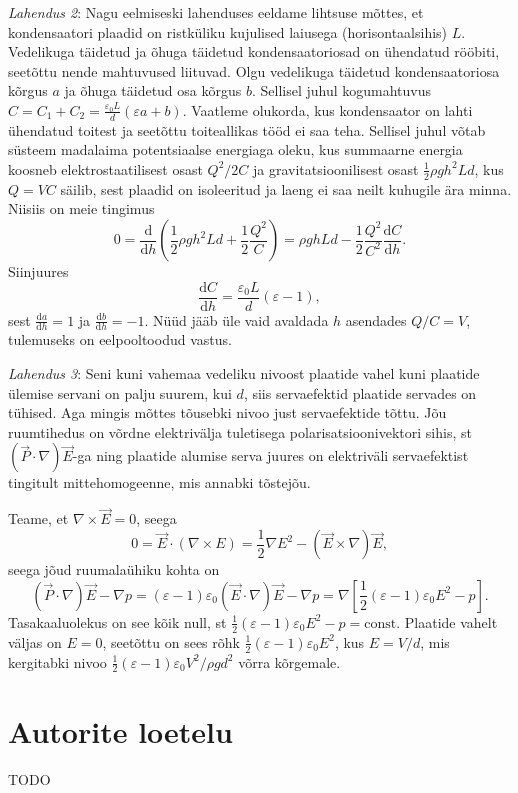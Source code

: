 \documentclass[10pt]{article}
\begin{document}
\textit{Lahendus 2}: Nagu eelmiseski lahenduses eeldame lihtsuse mõttes, et kondensaatori plaadid on ristküliku kujulised laiusega (horisontaalsihis) $L$. Vedelikuga täidetud ja õhuga täidetud kondensaatoriosad on ühendatud rööbiti, seetõttu nende mahtuvused liituvad. Olgu vedelikuga täidetud kondensaatoriosa kõrgus $a$ ja õhuga täidetud osa kõrgus $b$. Sellisel juhul  kogumahtuvus $C=C_1+C_2= \frac{\varepsilon_0 L}{d}(\varepsilon a+b)$. Vaatleme olukorda, kus kondensaator on lahti ühendatud toitest ja seetõttu toiteallikas tööd ei saa teha. Sellisel juhul võtab süsteem madalaima potentsiaalse energiaga oleku, kus summaarne energia koosneb elektrostaatilisest osast $Q^2/2C$ ja gravitatsioonilisest osast $\frac 12\rho g h^2Ld$, kus $Q=VC$ säilib, sest plaadid on isoleeritud ja laeng ei saa neilt kuhugile ära minna. Niisiis on meie tingimus
$$0=\frac {\mathrm d}{\mathrm d h}\left( \frac 12\rho g h^2Ld+\frac 12\frac{Q^2}C\right)= \rho g hLd-\frac 12\frac{Q^2}{C^{2}} \frac{\mathrm dC}{\mathrm dh}.$$
Siinjuures
$$ \frac{\mathrm dC}{\mathrm dh}=\frac{\varepsilon_0 L}{d}(\varepsilon -1),$$
sest $\frac{\mathrm da}{\mathrm dh}=1$ ja $\frac{\mathrm db}{\mathrm dh}=-1$. Nüüd jääb üle vaid avaldada $h$ asendades $Q/C=V$, tulemuseks on eelpooltoodud vastus.

\textit{Lahendus 3}:
Seni kuni vahemaa vedeliku nivoost plaatide vahel kuni plaatide ülemise servani on palju suurem, kui $d$, siis servaefektid plaatide servades on tühised. Aga mingis mõttes tõusebki nivoo just servaefektide tõttu. Jõu ruumtihedus on võrdne elektrivälja tuletisega polarisatsioonivektori sihis, st $(\vec P\cdot\nabla)\vec E$-ga ning plaatide alumise serva juures on elektriväli servaefektist tingitult mittehomogeenne, mis annabki tõstejõu.

Teame, et $\nabla \times\vec E=0$, seega
\[
  0=\vec E\cdot(\nabla \times E)=\frac 12 \nabla E^2-(\vec E\times\nabla)\vec E,
\]
seega jõud ruumalaühiku kohta on
\[(\vec P \cdot \nabla)\vec E-\nabla p=(\varepsilon-1)\varepsilon_0(\vec E \cdot \nabla)\vec E-\nabla p=\nabla \left[\frac 12(\varepsilon-1)\varepsilon_0E^2-p \right].
\] Tasakaaluolekus on see kõik null, st $\frac 12(\varepsilon-1)\varepsilon_0E^2-p=\text{const}$. Plaatide vahelt väljas on $E=0$, seetõttu on sees rõhk  $\frac 12(\varepsilon-1)\varepsilon_0E^2$, kus $E=V/d$, mis kergitabki nivoo  $\frac 12(\varepsilon-1)\varepsilon_0V^2/\rho gd^2$ võrra kõrgemale.
\probend
\bigskip
\newpage

\section{Autorite loetelu}

TODO
\end{document}
